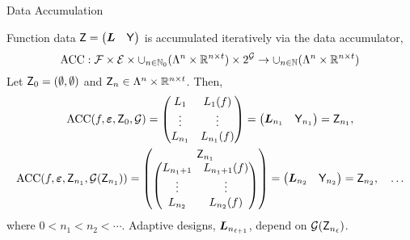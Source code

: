\documentclass[10pt,compress,xcolor={usenames,dvipsnames},aspectratio=169]{beamer}
\DeclareMathOperator{\DATA}{ACC}
\begin{document}
\begin{frame}{Data Accumulation}

\vspace{-4ex}

Function data $\mathsf{Z} =\begin{pmatrix}\boldsymbol{L} & \mathsf{Y}\end{pmatrix}$ is accumulated iteratively via the \alert{data accumulator},
\[
\DATA: \cf \times  \ce \times\cup_{n \in \natzero} (\Lambda^n \times \reals^{n\times t} ) \times 2^\cg\to  \cup_{n \in \naturals} (\Lambda^n \times \reals^{n\times t})
\]
Let $\mathsf{Z}_0 = (\emptyset, \emptyset)$ and $\mathsf{Z}_n \in \Lambda^n \times \mathbb{R}^{n\times t}$.  Then,
\begin{gather*}
\DATA(f,\veps, \mZ_0, \cg) = 
\begin{pmatrix} L_{1} & L_{1}(f) \\ \vdots & \vdots \\ L_{n_1} & L_{n_1}(f) \end{pmatrix} 
= \begin{pmatrix}
	\vL_{n_1} & \mY_{n_1}
\end{pmatrix}
= \mZ_{n_1}, \\ 
\DATA(f, \veps,\mZ_{n_1}, \cg(\mZ_{n_1})) = 
\begin{pmatrix}\mZ_{n_1} \\ \begin{pmatrix} L_{n_1+1} & L_{n_1+1}(f) \\ \vdots & \vdots \\ L_{n_2} & L_{n_2}(f) \end{pmatrix}  \end{pmatrix} 
= \begin{pmatrix}
	\vL_{n_2} & \mY_{n_2}
\end{pmatrix}
= \mZ_{n_2}, \quad \ldots
\end{gather*}
where $0 < n_1 < n_2 < \cdots$.  \alert{Adaptive} designs, $\boldsymbol{L}_{n_{\ell+1}}$, depend  on $ \mathcal{G}(\mathsf{Z}_{n_\ell})$.

\end{frame}
\end{document}
